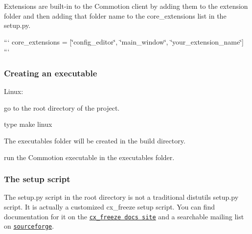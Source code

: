 Extensions are built-\/in to the Commotion client by adding them to the extension folder and then adding that folder name to the core\-\_\-extensions list in the setup.\-py.

``` core\-\_\-extensions = \mbox{[}\char`\"{}config\-\_\-editor\char`\"{}, \char`\"{}main\-\_\-window\char`\"{}, \char`\"{}your\-\_\-extension\-\_\-name\char`\"{}\mbox{]} ```

\subsubsection*{Creating an executable}

Linux\-:
\begin{DoxyItemize}
\item go to the root directory of the project.
\item type {\ttfamily make linux}
\item The executables folder will be created in the build directory.
\item run the {\ttfamily Commotion} executable in the executables folder.
\end{DoxyItemize}

\subsubsection*{The setup script}

The setup.\-py script in the root directory is not a traditional distutils setup.\-py script. It is actually a customized cx\-\_\-freeze setup script. You can find documentation for it on the \href{http://cx-freeze.readthedocs.org/en/latest/distutils.html}{\tt cx\-\_\-freeze docs site} and a searchable mailing list on \href{http://sourceforge.net/p/cx-freeze/mailman/cx-freeze-users/}{\tt sourceforge}. 